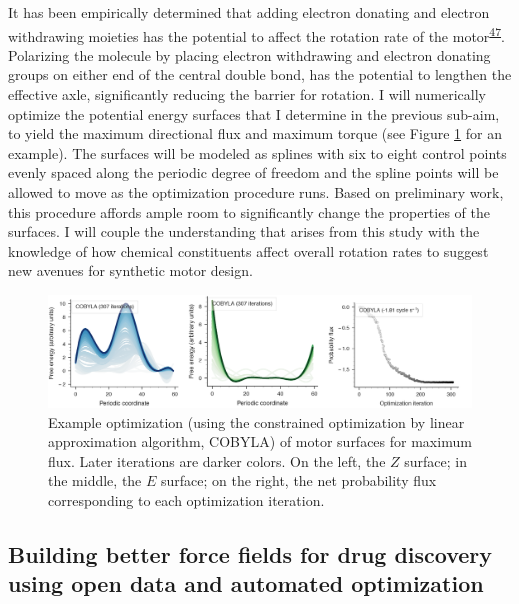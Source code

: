 \documentclass[11pt,notitlepage]{article}
\begin{document}
It has been empirically determined that adding electron donating and
electron withdrawing moieties has the potential to affect the rotation
rate of the
motor\textsuperscript{\protect\hyperlink{ref-1AzLiBVkC}{47}}. Polarizing
the molecule by placing electron withdrawing and electron donating
groups on either end of the central double bond, has the potential to
lengthen the effective axle, significantly reducing the barrier for
rotation. I will numerically optimize the potential energy surfaces that
I determine in the previous sub-aim, to yield the maximum directional
flux and maximum torque (see Figure \ref{fig:COBYLA} for an example).
The surfaces will be modeled as splines with six to eight control points
evenly spaced along the periodic degree of freedom and the spline points
will be allowed to move as the optimization procedure runs. Based on
preliminary work, this procedure affords ample room to significantly
change the properties of the surfaces. I will couple the understanding
that arises from this study with the knowledge of how chemical
constituents affect overall rotation rates to suggest new avenues for
synthetic motor design.

\begin{figure}
\centering
\includegraphics[width=1\textwidth,height=\textheight]{content/images/COBYLA.png}
\caption{Example optimization (using the constrained optimization by
linear approximation algorithm, COBYLA) of motor surfaces for maximum
flux. Later iterations are darker colors. On the left, the \(Z\)
surface; in the middle, the \(E\) surface; on the right, the net
probability flux corresponding to each optimization
iteration.\label{fig:COBYLA}}
\end{figure}

\hypertarget{building-better-force-fields-for-drug-discovery-using-open-data-and-automated-optimization}{%
\subsection{Building better force fields for drug discovery using open
data and automated
optimization}\label{building-better-force-fields-for-drug-discovery-using-open-data-and-automated-optimization}}
\end{document}
